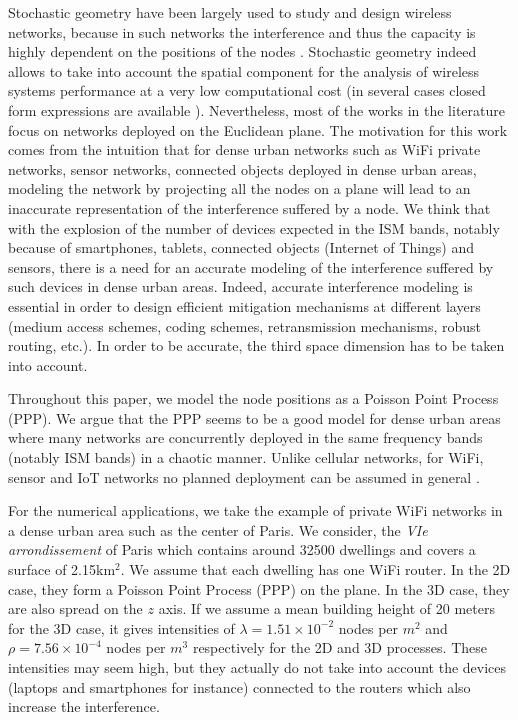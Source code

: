 \documentclass{sig-alternate-05-2015}
\begin{document}
Stochastic geometry have been largely used to study and design wireless networks, because in such networks the interference and thus the capacity is highly dependent on the positions of the nodes \cite{baccelli09,haenggi09}. Stochastic geometry indeed allows to take into account the spatial component for the analysis of wireless systems performance at a very low computational cost (in several cases closed form expressions are available \cite{baccelli09}). Nevertheless, most of the works in the literature focus on networks deployed on the Euclidean plane. The motivation for this work comes from the intuition that for dense urban networks such as WiFi private networks, sensor networks, connected objects  deployed in dense urban areas, modeling the network by projecting all the nodes on a plane will lead to an inaccurate representation of the interference suffered by a node. We think that with the explosion of the number of devices expected in the ISM bands, notably because of smartphones, tablets, connected objects (Internet of Things) and sensors, there is a need for an accurate modeling of the interference suffered by such devices in dense urban areas. Indeed, accurate interference modeling is essential in order to design efficient mitigation mechanisms at different layers (medium access schemes, coding schemes, retransmission mechanisms, robust routing, etc.). In order to be accurate, the third space dimension has to be taken into account.

Throughout this paper, we model the node positions as a Poisson Point Process (PPP). We argue that the PPP seems to be a good model for dense urban areas where many networks are concurrently deployed in the same frequency bands (notably ISM bands) in a chaotic manner. Unlike cellular networks, for WiFi, sensor and IoT networks no planned deployment can be assumed in general \cite{akella07}.

For the numerical applications, we take the example of private WiFi networks in a dense urban area such as the center of Paris. We consider, the \emph{VIe arrondissement} of Paris which contains around 32500 dwellings \cite{paris} and covers a surface of 2.15km$^2$. We assume that each dwelling has one WiFi router. In the 2D case, they form a Poisson Point Process (PPP) on the plane. In the 3D case, they are also spread on the $z$ axis. If we assume a mean building height of 20 meters for the 3D case, it gives intensities of $\lambda=1.51\times 10^{-2}$ nodes per $m^2$ and $\rho=7.56\times 10^{-4}$ nodes per $m^3$ respectively for the 2D and 3D processes. These intensities may seem high, but they actually do not take into account the devices (laptops and smartphones for instance) connected to the routers which also increase the interference.
\end{document}
